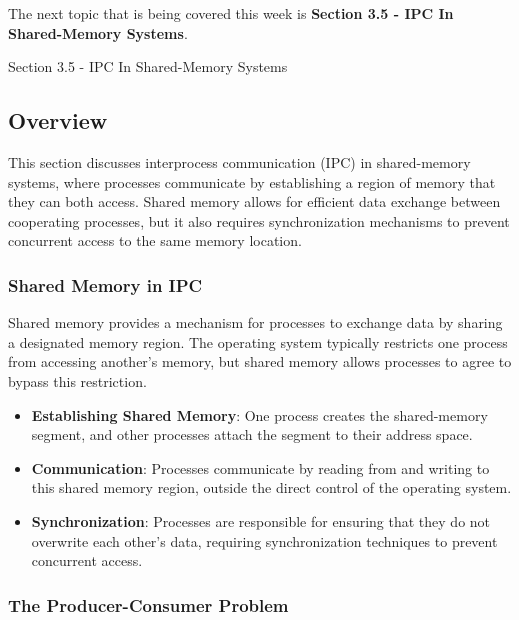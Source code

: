 The next topic that is being covered this week is \textbf{Section 3.5 - IPC In Shared-Memory Systems}.

\begin{notes}{Section 3.5 - IPC In Shared-Memory Systems}
    \subsection*{Overview}

    This section discusses interprocess communication (IPC) in shared-memory systems, where processes communicate by establishing a region of memory that they can both access. Shared memory allows for 
    efficient data exchange between cooperating processes, but it also requires synchronization mechanisms to prevent concurrent access to the same memory location.
    
    \subsubsection*{Shared Memory in IPC}
    
    Shared memory provides a mechanism for processes to exchange data by sharing a designated memory region. The operating system typically restricts one process from accessing another's memory, but 
    shared memory allows processes to agree to bypass this restriction.
    
    \begin{highlight}
    
        \begin{itemize}
            \item \textbf{Establishing Shared Memory}: One process creates the shared-memory segment, and other processes attach the segment to their address space.
            \item \textbf{Communication}: Processes communicate by reading from and writing to this shared memory region, outside the direct control of the operating system.
            \item \textbf{Synchronization}: Processes are responsible for ensuring that they do not overwrite each other's data, requiring synchronization techniques to prevent concurrent access.
        \end{itemize}
    
    \end{highlight}
    
    \subsubsection*{The Producer-Consumer Problem}
    

\end{notes}
